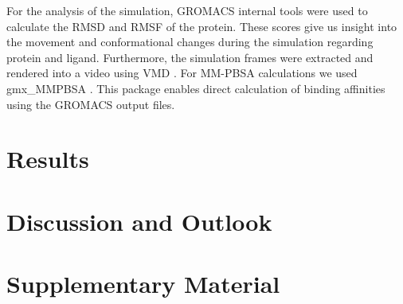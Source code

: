 \documentclass[11pt, letterpaper, titlepage]{article}
\renewcommand{\cite}{\parencite}
\begin{document}
\noindent For the analysis of the simulation, GROMACS internal tools were used to calculate the \ac{RMSD} and \ac{RMSF} of the protein. These scores give us insight into the movement and conformational changes during the simulation regarding protein and ligand. Furthermore, the simulation frames were extracted and rendered into a video using VMD \cite{VMD}. For MM-PBSA calculations we used gmx\_MMPBSA \cite{MMPBSA1}. This package enables direct calculation of binding affinities using the GROMACS output files.

\section{Results}

\FloatBarrier

\section{Discussion and Outlook}

\section{Supplementary Material}

\pagebreak
\FloatBarrier
\renewcommand{\bibname}{References}  %
\printbibliography
\end{document}
